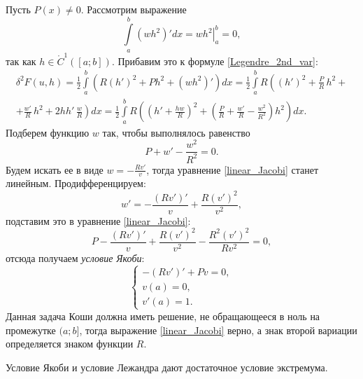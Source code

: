 \documentclass[12pt,a5paper]{book}
\begin{document}
	Пусть $P(x) \neq 0$. Рассмотрим выражение
	\begin{equation*}
		\int\limits_a^b \left(wh^2\right)'dx = \left.wh^2\right|_a^b = 0,
	\end{equation*}
	так как $h \in \mathring{C}^1([a;b])$. Прибавим это к формуле \eqref{Legendre_2nd_var}:
	\begin{equation*}
		\begin{split}
			\delta^2F(u,h) = \frac{1}{2}\int\limits_a^b\left(R\left(h'\right)^2 + Ph^2 + \left(wh^2\right)'\right)dx = \frac{1}{2}\int\limits_a^b R\left(\left(h'\right)^2 + \frac{P}{R}\,h^2 + \right.\\\left. + \frac{w'}{R}\,h^2 + 2hh'\,\frac{w}{R}\right)dx = \frac{1}{2}\int\limits_a^b R\left(\left(h' + \frac{hw}{R}\right)^2 + \left(\frac{P}{R} + \frac{w'}{R} - \frac{w^2}{R^2}\right)h^2\right)dx.
		\end{split}
	\end{equation*}
	Подберем функцию $w$ так, чтобы выполнялось равенство
	\begin{equation}\label{linear_Jacobi}
		P + w' - \frac{w^2}{R^2} = 0.
	\end{equation}
	Будем искать ее в виде $w = -\frac{Rv'}{v}$, тогда уравнение \eqref{linear_Jacobi} станет линейным. Продифференцируем:
	\begin{equation*}
		w' = -\frac{\left(Rv'\right)'}{v} + \frac{R\left(v'\right)^2}{v^2},
	\end{equation*}
	подставим это в уравнение \eqref{linear_Jacobi}:
	\begin{equation*}
		P - \frac{\left(Rv'\right)'}{v} + \frac{R\left(v'\right)^2}{v^2} - \frac{R^2\left(v'\right)^2}{Rv^2} = 0,
	\end{equation*}
	отсюда получаем \emph{условие Якоби}:
	\begin{equation}\label{Jacobi}
		\begin{cases}
			-\left(Rv'\right)' + Pv = 0, \\
			v(a) = 0, \\
			v'(a) = 1.
		\end{cases}
	\end{equation}
	Данная задача Коши должна иметь решение, не обращающееся в ноль на промежутке $(a;b]$, тогда выражение \eqref{linear_Jacobi} верно, а знак второй вариации определяется знаком функции $R$.
	
	Условие Якоби и условие Лежандра дают достаточное условие экстремума.
	
\end{document}
